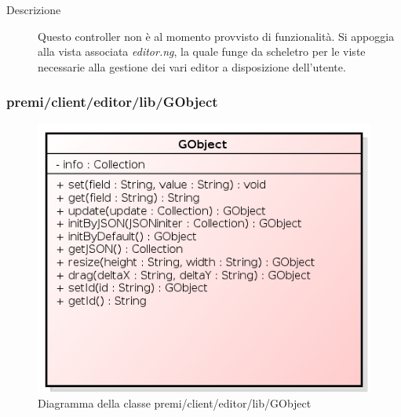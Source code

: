 \begin{description}
\item[Descrizione] \hfill
	Questo controller non è al momento provvisto di funzionalità. Si appoggia alla vista associata \textit{editor.ng}, la quale funge da scheletro per le viste necessarie alla gestione dei vari editor a disposizione dell'utente. 
\end{description}


\subsubsection{premi/client/editor/lib/GObject}
\begin{figure}[H]
\begin{center}
\includegraphics[scale=0.80]{img/diacla/GObject.png}
\caption{Diagramma della classe premi/client/editor/lib/GObject}
\end{center}
\end{figure}


